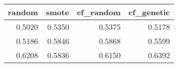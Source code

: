 \begin{tabular}{rrrr}
\toprule
 random &  smote &  cf\_random &  cf\_genetic \\
\midrule
 0.5020 & 0.5350 &     0.5375 &      0.5178 \\
 0.5186 & 0.5846 &     0.5868 &      0.5599 \\
 0.6208 & 0.5836 &     0.6150 &      0.6392 \\
\bottomrule
\end{tabular}
